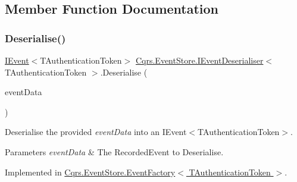 \subsection{Member Function Documentation}
\mbox{\label{interfaceCqrs_1_1EventStore_1_1IEventDeserialiser_ad84a4d975f6e2b5b1fef3fd23e738bfd_ad84a4d975f6e2b5b1fef3fd23e738bfd}} 
\subsubsection{\texorpdfstring{Deserialise()}{Deserialise()}\hspace{0.1cm}{\footnotesize\ttfamily [1/2]}}
{\footnotesize\ttfamily \hyperlink{interfaceCqrs_1_1Events_1_1IEvent}{I\+Event}$<$T\+Authentication\+Token$>$ \hyperlink{interfaceCqrs_1_1EventStore_1_1IEventDeserialiser}{Cqrs.\+Event\+Store.\+I\+Event\+Deserialiser}$<$ T\+Authentication\+Token $>$.Deserialise (\begin{DoxyParamCaption}\item[{Recorded\+Event}]{event\+Data }\end{DoxyParamCaption})}



Deserialise the provided {\itshape event\+Data}  into an I\+Event$<$\+T\+Authentication\+Token$>$. 


\begin{DoxyParams}{Parameters}
{\em event\+Data} & The Recorded\+Event to Deserialise.\\
\hline
\end{DoxyParams}


Implemented in \hyperlink{classCqrs_1_1EventStore_1_1EventFactory_abfd04f6833e4f010234d84a591f6eb6b_abfd04f6833e4f010234d84a591f6eb6b}{Cqrs.\+Event\+Store.\+Event\+Factory$<$ T\+Authentication\+Token $>$}.

\mbox{\label{interfaceCqrs_1_1EventStore_1_1IEventDeserialiser_a931d4a498b2213aac492bd35518a3286_a931d4a498b2213aac492bd35518a3286}} 
